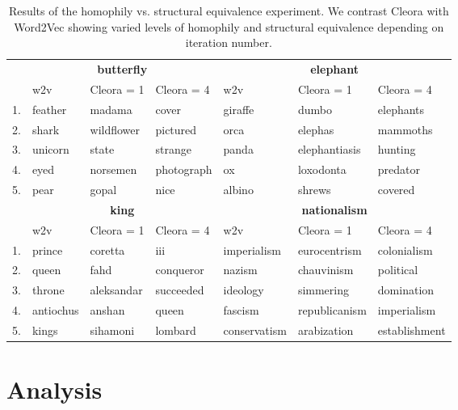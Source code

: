 \documentclass{IEEEtran}
\begin{document}
\begin{table*}
    \centering


\begin{tabular}{l|lll|lll} 
 & \multicolumn{3}{c}{\textbf{butterfly}}
 & \multicolumn{3}{c}{\textbf{elephant}} \\

 & w2v & Cleora  = 1 & Cleora  = 4
 & w2v & Cleora  = 1 & Cleora  = 4
 \\\hline
 
 1. & feather & madama & cover & giraffe & dumbo & elephants  \\                        
 2. & shark & wildflower & pictured & orca & elephas & mammoths \\                      
 3. & unicorn & state & strange & panda & elephantiasis & hunting \\                      
 4. & eyed & norsemen & photograph &  ox & loxodonta & predator   \\
 5. & pear & gopal & nice & albino & shrews & covered \\ 
 \hline
& \multicolumn{3}{c}{\textbf{king}} 
 & \multicolumn{3}{c}{\textbf{nationalism}} \\
 & w2v & Cleora  = 1 & Cleora  = 4 
 & w2v & Cleora  = 1 & Cleora  = 4 \\\hline
 
 1. & prince & coretta & iii & imperialism & eurocentrism & colonialism \\ 
 2. & queen & fahd & conqueror & nazism & chauvinism & political \\                    
 3. & throne & aleksandar & succeeded & ideology & simmering & domination\\ 
 4. & antiochus & anshan & queen & fascism & republicanism & imperialism\\          
 5. & kings & sihamoni & lombard & conservatism & arabization & establishment\\

\end{tabular} 
\caption{Results of the homophily vs. structural equivalence experiment. We contrast Cleora with Word2Vec \cite{Word2Vec} showing varied levels of homophily and structural equivalence depending on iteration number.}
\label{tab-struct-vs-functional}
\end{table*}


\section{Analysis}
\end{document}
